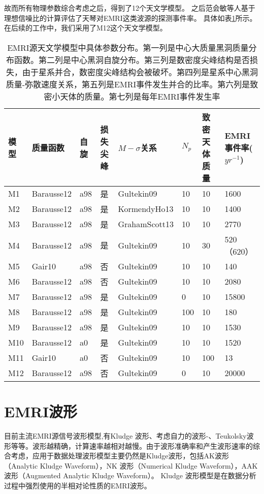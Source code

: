 故而所有物理参数综合考虑之后，得到了12个天文学模型。
之后范会敏等人\cite{Fan:2020zhy}基于理想信噪比的计算评估了天琴对EMRI这类波源的探测事件率。
具体如表\ref{tab:astro-models}所示。在后续的工作中，我们采用了M12这个天文学模型。
\begin{table}[htbp]  
\begin{tabularx}{14.5cm}{p{1cm}p{2cm}p{1cm}p{1cm}p{2.5cm}p{1cm}p{1.5cm}|p{2cm}}  %
\hline                      %
模型 & 质量函数  & 自旋  & 损失尖峰 & $M-\sigma$关系 & $N_p$ &致密天体质量 & EMRI事件率($yr^{-1}$)\\  
\hline  
M1 & Barausse12  & a98  & 是 & Gultekin09 & 10 &10 & 1600\\ 
M2 & Barausse12  & a98  & 是 & KormendyHo13 & 10 &10 & 1400\\
M3 & Barausse12  & a98  & 是 & GrahamScott13 & 10 &10 & 2770\\  
M4 & Barausse12  & a98  & 是 & Gultekin09 & 10 &30 & 520（620）\\ 
M5 & Gair10  & a98  & 否 & Gultekin09 & 10 &10 & 140\\
M6 & Barausse12  & a98  & 否 & Gultekin09 & 10 &10 & 2080\\ 
M7 & Barausse12  & a98  & 是 & Gultekin09 & 0 &10 & 15800\\ 
M8 & Barausse12  & a98  & 是 & Gultekin09 & 100 &10 & 180\\
M9 & Barausse12  & a98  & 是 & Gultekin09 & 10 &10 & 1530\\  
M10 & Barausse12  & a0  & 是 & Gultekin09 & 10 &10 & 1520\\ 
M11 & Gair10  & a0  & 否 & Gultekin09 & 10 &100 & 13\\
M12 & Barausse12  & a98  & 否 & Gultekin09 & 0 &10 & 20000\\ 
\hline  
\end{tabularx} 
\caption{EMRI源天文学模型中具体参数分布。第一列是中心大质量黑洞质量分布函数。第二列是中心黑洞自旋分布。第三列是数密度尖峰结构是否损失，由于星系并合，数密度尖峰结构会被破坏。第四列是星系中心黑洞质量-弥散速度关系，第五列是EMRI事件发生并合的比率。第六列是致密小天体的质量。第七列是每年EMRI事件发生率} 
\label{tab:astro-models}
\end{table} 






\section{EMRI波形}
目前主流EMRI源信号波形模型,有Kludge 波形\cite{barack2004lisa}\cite{babak2007kludge}\cite{chua2015improved}、考虑自力的波形\cite{van2018gravitational}-\cite{barack2009gravitational}、Teukolsky波形\cite{hughes2005gravitational}等等。波形越精确，计算速率越相对越慢。由于波形准确率和产生波形速率的综合考虑，应用于数据处理波形模型主要仍然是Kludge波形，包括AK波形（Analytic Kludge Waveform）\cite{barack2004lisa}，NK 波形（Numerical Kludge Waveform）\cite{babak2007kludge}，AAK波形（Augmented Analytic Kludge Waveform）\cite{chua2015improved}。
Kludge 波形模型是在数据分析过程中强烈使用的半相对论性质的EMRI波形。


